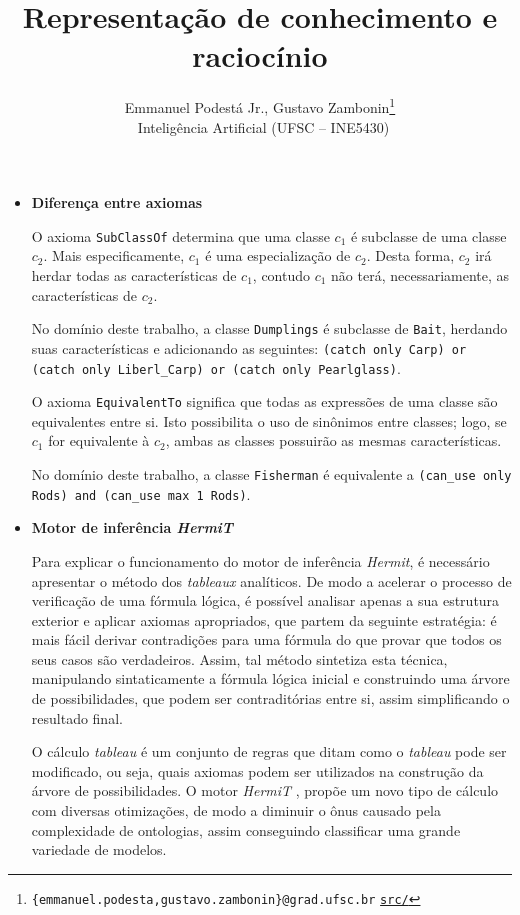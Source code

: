 \documentclass{article}
\title{\textbf{Representação de conhecimento e raciocínio}}
\author{Emmanuel Podestá Jr., Gustavo Zambonin\thanks{
        \texttt{\{emmanuel.podesta,gustavo.zambonin\}@grad.ufsc.br} \hfill
        \texttt{\href{https://github.com/zambonin/ufsc-ine5430}{src/}}
    } \\ \
    \small{Inteligência Artificial (UFSC -- INE5430)}
}
\date{}
\begin{document}
\maketitle

\begin{itemize}

    \item \textbf{Diferença entre axiomas}

        O axioma \texttt{SubClassOf} determina que uma classe $c_1$ é
        subclasse de uma classe $c_2$. Mais especificamente, $c_1$ é uma
        especialização de $c_2$. Desta forma, $c_2$ irá herdar todas as
        características de $c_1$, contudo $c_1$ não terá, necessariamente, as
        características de $c_2$.

        No domínio deste trabalho, a classe \texttt{Dumplings} é subclasse
        de \texttt{Bait}, herdando suas características e adicionando as
        seguintes: \texttt{(catch only Carp) or (catch only Liberl\_Carp) or
        (catch only Pearlglass)}.

        O axioma \texttt{EquivalentTo} significa que todas as expressões de
        uma classe são equivalentes entre si. Isto possibilita o uso de
        sinônimos entre classes; logo, se $c_1$ for equivalente à $c_2$, ambas
        as classes possuirão as mesmas características.

        No domínio deste trabalho, a classe \texttt{Fisherman} é equivalente
        a \texttt{(can\_use only Rods) and (can\_use max 1 Rods)}.

    \item \textbf{Motor de inferência \emph{HermiT}}

        Para explicar o funcionamento do motor de inferência \emph{Hermit}, é
        necessário apresentar o método dos \emph{tableaux} analíticos. De modo
        a acelerar o processo de verificação de uma fórmula lógica, é possível
        analisar apenas a sua estrutura exterior e aplicar axiomas
        apropriados, que partem da seguinte estratégia: é mais fácil derivar
        contradições para uma fórmula do que provar que todos os seus casos
        são verdadeiros. Assim, tal método sintetiza esta técnica, manipulando
        sintaticamente a fórmula lógica inicial e construindo uma árvore de
        possibilidades, que podem ser contraditórias entre si, assim
        simplificando o resultado final. \cite{Constable:2012}

        O cálculo \emph{tableau} é um conjunto de regras que ditam como o
        \emph{tableau} pode ser modificado, ou seja, quais axiomas podem ser
        utilizados na construção da árvore de possibilidades. O motor
        \emph{HermiT} \cite{smh08HermiT}, propõe um novo tipo de cálculo com
        diversas otimizações, de modo a diminuir o ônus causado pela
        complexidade de ontologias, assim conseguindo classificar uma grande
        variedade de modelos.


\end{itemize}
\end{document}
